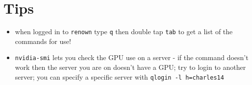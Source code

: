 \documentclass[]{article}
\begin{document}
\section{Tips}\label{tips}

\begin{itemize}
\itemsep1pt\parskip0pt
\item
  when logged in to \texttt{renown} type \texttt{q} then double tap
  \texttt{tab} to get a list of the commands for use!
\item
  \texttt{nvidia-smi} lets you check the GPU use on a server - if the
  command doesn't work then the server you are on doesn't have a GPU;
  try to login to another server; you can specify a specific server with
  \texttt{qlogin -l h=charles14}
\end{itemize}
\end{document}
